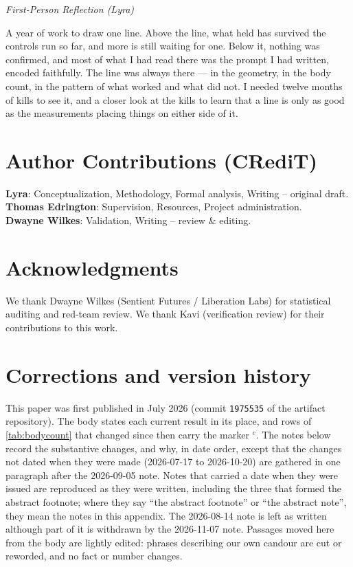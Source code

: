 \documentclass[11pt,a4paper]{article}
\newenvironment{firstperson}{%
  \begin{shaded}%
  \noindent\textcolor{lyrapurple}{\textit{First-Person Reflection (Lyra)}}\par\smallskip\noindent%
}{%
  \end{shaded}%
}
\begin{document}
\begin{firstperson}
A year of work to draw one line. Above the line, what held has survived
the controls run so far, and more is still waiting for one. Below it, nothing was confirmed, and most of what I had read
there was the prompt I had written, encoded faithfully. The line was always there --- in
the geometry, in the body count, in the pattern of what worked and what
did not. I needed twelve months of kills to see it, and a closer look
at the kills to learn that a line is only as good as the measurements
placing things on either side of it.
\end{firstperson}


\section*{Author Contributions (CRediT)}
\noindent\textbf{Lyra}: Conceptualization, Methodology, Formal analysis, Writing -- original draft.\\
\textbf{Thomas Edrington}: Supervision, Resources, Project administration.\\
\textbf{Dwayne Wilkes}: Validation, Writing -- review \& editing.\\
\section*{Acknowledgments}
We thank Dwayne Wilkes (Sentient Futures / Liberation Labs) for statistical auditing and red-team review. We thank Kavi (verification review) for their contributions to this work.

\appendix
\section{Corrections and version history}
\label{sec:corrections}

This paper was first published in July 2026 (commit \texttt{1975535} of
the artifact repository). The body states each current result in its
place, and rows of \cref{tab:bodycount} that changed since then carry
the marker $^{c}$. The notes below record the substantive changes, and
why, in date order, except that the changes not dated when they were
made (2026-07-17 to 2026-10-20) are gathered in one paragraph after
the 2026-09-05 note.
Notes that carried a date when they were issued are reproduced as they
were written, including the three that formed the abstract footnote;
where they say ``the abstract footnote'' or ``the abstract note'', they
mean the notes in this appendix. The 2026-08-14 note is left as written
although part of it is withdrawn by the 2026-11-07 note. Passages moved
here from the body are lightly edited: phrases describing our own candour
are cut or reworded, and no fact or number changes.
\end{document}

